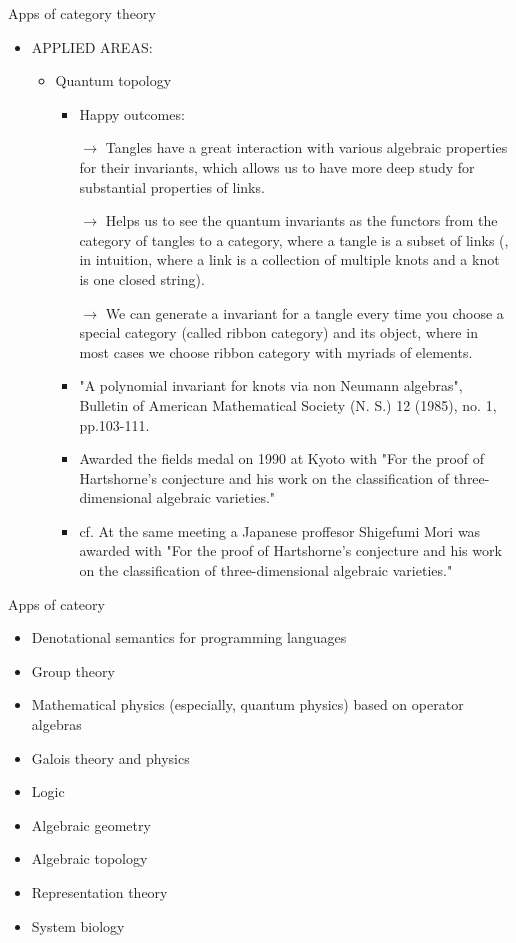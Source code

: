 \documentclass[dvipdfmx,10pt,notheorems]{beamer}
\renewcommand{\#}{^\sharp}
\begin{document}
	\begin{frame}{Apps of category theory}
		\begin{itemize}
			\item APPLIED AREAS:
				\begin{itemize}
					\item Quantum topology
						\begin{itemize}
							\item Happy outcomes:
							\item[$\rightarrow$]  Tangles have a great interaction with various algebraic properties for
		their invariants, which allows us to have more deep study for
		substantial properties of links.
							\item[$\rightarrow$]  Helps us to see the quantum invariants as the functors from the
		category of tangles to a category, where a tangle is a subset of links
		(, in intuition, where a link is a collection of multiple knots and a knot
		is one closed string).
							\item[$\rightarrow$] We can generate a invariant for a tangle every time you choose a
		special category (called ribbon category) and its object, where in
		most cases we choose ribbon category with myriads of elements.
							\item "A polynomial invariant for knots via non Neumann algebras",
		Bulletin of American Mathematical Society (N. S.) 12 (1985), no. 1, pp.103-111.
							\item Awarded the fields medal on 1990 at Kyoto with "For the proof of
		Hartshorne's conjecture and his work on the classification of
		three-dimensional algebraic varieties."
							\item cf. At the same meeting a Japanese proffesor Shigefumi Mori was
		awarded with "For the proof of Hartshorne's conjecture and his work
		on the classification of three-dimensional algebraic varieties."
						\end{itemize}
				\end{itemize}
		\end{itemize}
	\end{frame}






	\begin{frame}{Apps of cateory}
		\begin{itemize}
			\item Denotational semantics for programming languages
			\item Group theory
			\item Mathematical physics (especially, quantum physics) based on operator algebras
			\item Galois theory and physics
			\item Logic
			\item Algebraic geometry
			\item Algebraic topology
			\item Representation theory
			\item System biology
		\end{itemize}
	\end{frame}
\end{document}
